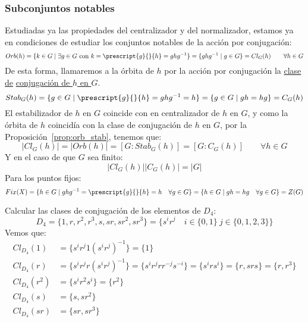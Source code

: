 \subsubsection{Subconjuntos notables}
\noindent
Estudiadas ya las propiedades del centralizador y del normalizador, estamos ya en condiciones de estudiar los conjuntos notables de la acción por conjugación:
\begin{equation*}
    Orb(h) = \{k\in G \mid \exists g\in G \text{\ con\ } k = \prescript{g}{}{h} = ghg^{-1}\} = \{ghg^{-1}\mid g\in G\} = Cl_G(h) \qquad \forall h\in G
\end{equation*}
De esta forma, llamaremos a la órbita de $h$ por la acción por conjugación la \underline{clase de} \underline{conjugación de $h$ en $G$}.
\begin{equation*}
    Stab_G(h) = \{g\in G \mid \prescript{g}{}{h} = ghg^{-1} = h\} = \{g \in G \mid gh = hg\} = C_G(h)
\end{equation*}
El estabilizador de $h$ en $G$ coincide con en centralizador de $h$ en $G$, y como la órbita de $h$ coincidía con la clase de conjugación de $h$ en $G$, por la Proposición~\ref{prop:orb_stab}, tenemos que:
\begin{equation*}
    |Cl_G(h)| = |Orb(h)| = [G:Stab_G(h)] = [G:C_G(h)] \qquad \forall h\in G
\end{equation*}
Y en el caso de que $G$ sea finito:
\begin{equation*}
    |Cl_G(h)| |C_G(h)| = |G|
\end{equation*}
Para los puntos fijos:
\begin{equation*}
    Fix(X) = \{h\in G \mid ghg^{-1} = \prescript{g}{}{h} = h \quad \forall g\in G\} = \{h\in G\mid gh = hg \quad \forall g\in G\} = Z(G)
\end{equation*}

\begin{ejemplo}
    Calcular las clases de conjugación de los elementos de $D_4$:
    \begin{equation*}
        D_4 = \{1,r,r^2, r^3, s, sr, sr^2, sr^3\} = \{s^i r^j \quad i \in \{0,1\}\ j \in \{0,1,2,3\}\}
    \end{equation*}
    Vemos que:
    \begin{align*}
        Cl_{D_4}(1) &= \{s^ir^j 1 {(s^i r^j)}^{-1}\} = \{1\} \\
        Cl_{D_4}(r) &= \{s^ir^j r {(s^i r^j)}^{-1}\} = \{s^i r^j rr^{-j}s^{-i}\} = \{s^i r s^{i}\} = \{r, srs\} = \{r,r^3\} \\ %
        Cl_{D_4}(r^2) &= \{s^i r^2 s^i\} = \{r^2\} \\
        Cl_{D_4}(s) &= \{s,sr^2\} \\
        Cl_{D_4}(sr) &= \{sr,sr^3\} 
    \end{align*}
\end{ejemplo}

